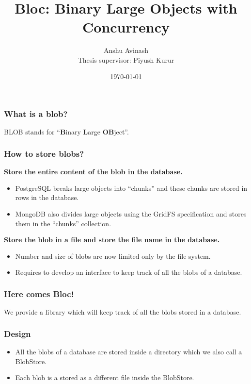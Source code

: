\documentclass[10pt]{beamer}
\title{Bloc: Binary Large Objects with Concurrency}
\subtitle{}
\date{\today}
\author{Anshu Avinash \\
  Thesis supervisor: Piyush Kurur}
\institute{Department of CSE, IIT Kanpur}
\begin{document}
\maketitle

\begin{frame}
  \frametitle{What is a blob?}

  BLOB stands for ``\textbf{B}inary \textbf{L}arge \textbf{OB}ject''.
  \begin{center}
  \end{center}

\end{frame}

\begin{frame}[allowframebreaks]
  \frametitle{How to store blobs?}

  \textbf {Store the entire content of the blob in the database.}
  \begin{itemize}
    \item PostgreSQL breaks large objects into ``chunks'' and these chunks are
      stored in rows in the database.
    \item MongoDB also divides large objects using the GridFS specification and stores
      them in the ``chunks'' collection.
  \end{itemize}

  \framebreak

  \textbf {Store the blob in a file and store the file name in the database.}
  \begin{itemize}
    \item Number and size of blobs are now limited only by the file system.
    \item Requires to develop an interface to keep track of all the blobs of a database.
  \end{itemize}
\end{frame}

\begin{frame}
  \frametitle{Here comes Bloc!}

  We provide a library which will keep track of all the blobs stored in a database. \\

\end{frame}

\begin{frame}
  \frametitle{Design}
  \begin{itemize}[<+->]
    \item All the blobs of a database are stored inside a directory which we also call a \alert{BlobStore}.
    \item Each blob is a stored as a different file inside the BlobStore.
  \end{itemize}
\end{frame}
\end{document}
